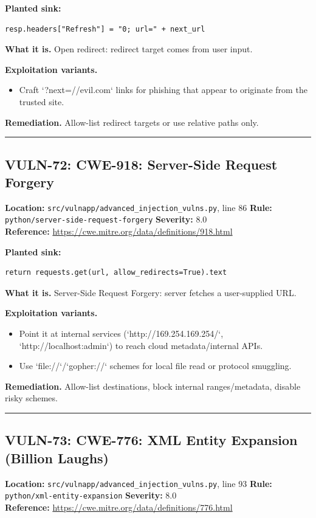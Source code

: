 \documentclass[11pt,a4paper]{article}
\begin{document}
\noindent\textbf{Planted sink:}
\begin{lstlisting}
resp.headers["Refresh"] = "0; url=" + next_url
\end{lstlisting}
\noindent\textbf{What it is.} Open redirect: redirect target comes from user input.

\noindent\textbf{Exploitation variants.}
\begin{itemize}[leftmargin=1.4em,itemsep=1pt,topsep=2pt]
\item Craft `?next=//evil.com` links for phishing that appear to originate from the trusted site.
\end{itemize}
\noindent\textbf{Remediation.} Allow-list redirect targets or use relative paths only.

\vspace{4pt}\hrule\vspace{6pt}
\subsection{VULN-72: CWE-918: Server-Side Request Forgery}
\noindent\textbf{Location:} \texttt{src/vulnapp/advanced\_injection\_vulns.py}, line 86 \quad \textbf{Rule:} \texttt{python/server-side-request-forgery} \quad \textbf{Severity:} 8.0
\\ \textbf{Reference:} \url{https://cwe.mitre.org/data/definitions/918.html}

\noindent\textbf{Planted sink:}
\begin{lstlisting}
return requests.get(url, allow_redirects=True).text
\end{lstlisting}
\noindent\textbf{What it is.} Server-Side Request Forgery: server fetches a user-supplied URL.

\noindent\textbf{Exploitation variants.}
\begin{itemize}[leftmargin=1.4em,itemsep=1pt,topsep=2pt]
\item Point it at internal services (`http://169.254.169.254/`, `http://localhost:admin`) to reach cloud metadata/internal APIs.
\item Use `file://`/`gopher://` schemes for local file read or protocol smuggling.
\end{itemize}
\noindent\textbf{Remediation.} Allow-list destinations, block internal ranges/metadata, disable risky schemes.

\vspace{4pt}\hrule\vspace{6pt}
\subsection{VULN-73: CWE-776: XML Entity Expansion (Billion Laughs)}
\noindent\textbf{Location:} \texttt{src/vulnapp/advanced\_injection\_vulns.py}, line 93 \quad \textbf{Rule:} \texttt{python/xml-entity-expansion} \quad \textbf{Severity:} 8.0
\\ \textbf{Reference:} \url{https://cwe.mitre.org/data/definitions/776.html}
\end{document}
